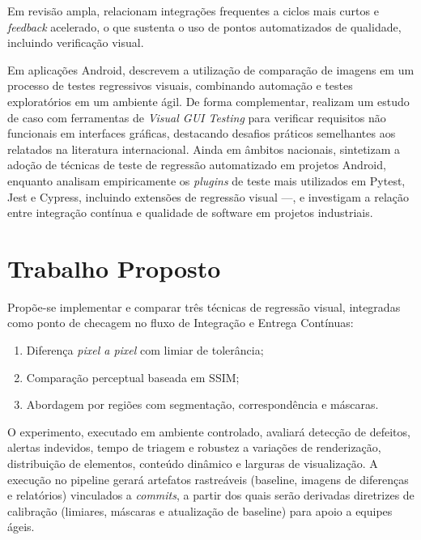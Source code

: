 \documentclass{UNESC}
\begin{document}
Em revisão ampla,  relacionam integrações frequentes a ciclos mais curtos e \emph{feedback} acelerado, o que sustenta o uso de pontos automatizados de qualidade, incluindo verificação visual.

Em aplicações Android,  descrevem a utilização de comparação de imagens em um processo de testes regressivos visuais, combinando automação e testes exploratórios em um ambiente ágil. De forma complementar,  realizam um estudo de caso com ferramentas de \emph{Visual GUI Testing} para verificar requisitos não funcionais em interfaces gráficas, destacando desafios práticos semelhantes aos relatados na literatura internacional. Ainda em âmbitos nacionais,  sintetizam a adoção de técnicas de teste de regressão automatizado em projetos Android, enquanto  analisam empiricamente os \emph{plugins} de teste mais utilizados em Pytest, Jest e Cypress, incluindo extensões de regressão visual —, e  investigam a relação entre integração contínua e qualidade de software em projetos industriais.

\section{Trabalho Proposto}

Propõe-se implementar e comparar três técnicas de regressão visual, 
integradas como ponto de checagem no fluxo de Integração e Entrega Contínuas:
\begin{enumerate}[label=\alph*),leftmargin=1.5em]
    \item Diferença \emph{pixel a pixel} com limiar de tolerância;
    \item Comparação perceptual baseada em SSIM;
    \item Abordagem por regiões com segmentação, correspondência e máscaras.
\end{enumerate}
O experimento, executado em ambiente controlado, avaliará detecção de defeitos, alertas indevidos, tempo de triagem e robustez a variações de renderização, distribuição de elementos, conteúdo dinâmico e larguras de visualização. A execução no pipeline gerará artefatos rastreáveis (baseline, imagens de diferenças e relatórios) vinculados a \emph{commits}, a partir dos quais serão derivadas diretrizes de calibração (limiares, máscaras e atualização de baseline) para apoio a equipes ágeis.
\end{document}
